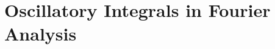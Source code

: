 \documentclass[../../main.tex]{subfiles}
\begin{document}
\chapter{Oscillatory Integrals in Fourier Analysis}
\end{document}

